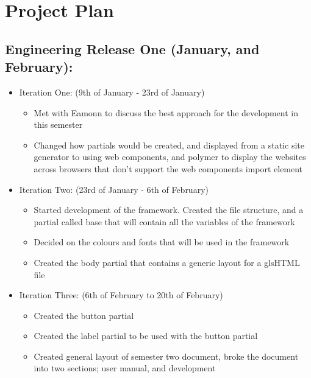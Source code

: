 \newpage
\section*{Project Plan}
\subsection*{Engineering Release One (January, and February):}
\begin{itemize}
	\item Iteration One: (9th of January - 23rd of January)\begin{itemize} 
	\item Met with Eamonn to discuss the best approach for the development in this semester
	\item Changed how partials would be created, and displayed from a static site generator to using web components, and polymer to display the websites across browsers that don't support the web components import element
	\end{itemize}
	\item Iteration Two: (23rd of January - 6th of February) \begin{itemize}
	\item Started development of the framework. Created the file structure, and a partial called base that will contain all the variables of the framework
	\item Decided on the colours and fonts that will be used in the framework
	\item Created the body partial that contains a generic layout for a gls{HTML} file
	\end{itemize}
	\item Iteration Three: (6th of February to 20th of February)\begin{itemize}
	\item Created the button partial
	\item Created the label partial to be used with the button partial
	\item Created general layout of semester two document, broke the document into two sections; user manual, and development
	\end{itemize}

\end{itemize}
